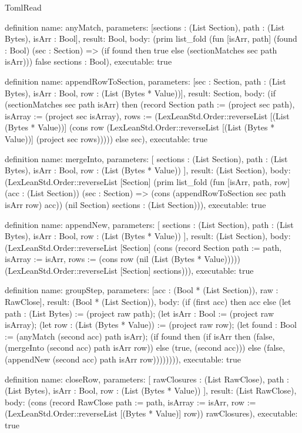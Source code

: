 \begin{lexlean}{TomlRead}
\begin{semanticmodule}
definition{
  name: anyMatch,
  parameters: [sections : (List Section), path : (List Bytes), isArr : Bool],
  result: Bool,
  body: (prim list_fold (fun [isArr, path] (found : Bool) (sec : Section) => (if found then true else (sectionMatches sec path isArr))) false sections : Bool),
  executable: true
}

definition{
  name: appendRowToSection,
  parameters: [sec : Section, path : (List Bytes), isArr : Bool, row : (List (Bytes * Value))],
  result: Section,
  body: (if (sectionMatches sec path isArr) then (record Section {path := (project sec path), isArray := (project sec isArray), rows := (LexLeanStd.Order::reverseList [(List (Bytes * Value))] (cons row (LexLeanStd.Order::reverseList [(List (Bytes * Value))] (project sec rows))))}) else sec),
  executable: true
}

definition{
  name: mergeInto,
  parameters: [
    sections : (List Section),
    path : (List Bytes),
    isArr : Bool,
    row : (List (Bytes * Value))
  ],
  result: (List Section),
  body: (LexLeanStd.Order::reverseList [Section] (prim list_fold (fun [isArr, path, row] (acc : (List Section)) (sec : Section) => (cons (appendRowToSection sec path isArr row) acc)) (nil Section) sections : (List Section))),
  executable: true
}

definition{
  name: appendNew,
  parameters: [
    sections : (List Section),
    path : (List Bytes),
    isArr : Bool,
    row : (List (Bytes * Value))
  ],
  result: (List Section),
  body: (LexLeanStd.Order::reverseList [Section] (cons (record Section {path := path, isArray := isArr, rows := (cons row (nil (List (Bytes * Value))))}) (LexLeanStd.Order::reverseList [Section] sections))),
  executable: true
}

definition{
  name: groupStep,
  parameters: [acc : (Bool * (List Section)), raw : RawClose],
  result: (Bool * (List Section)),
  body: (if (first acc) then acc else (let path : (List Bytes) := (project raw path); (let isArr : Bool := (project raw isArray); (let row : (List (Bytes * Value)) := (project raw row); (let found : Bool := (anyMatch (second acc) path isArr); (if found then (if isArr then (false, (mergeInto (second acc) path isArr row)) else (true, (second acc))) else (false, (appendNew (second acc) path isArr row)))))))),
  executable: true
}

definition{
  name: closeRow,
  parameters: [
    rawClosures : (List RawClose),
    path : (List Bytes),
    isArr : Bool,
    row : (List (Bytes * Value))
  ],
  result: (List RawClose),
  body: (cons (record RawClose {path := path, isArray := isArr, row := (LexLeanStd.Order::reverseList [(Bytes * Value)] row)}) rawClosures),
  executable: true
}


\end{semanticmodule}
\end{lexlean}
